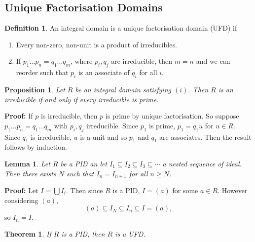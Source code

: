 \documentclass[12pt]{article}
\newtheorem{theorem}{Theorem}[section]
\newtheorem{lemma}{Lemma}[section]
\newtheorem{proposition}{Proposition}[section]
\theoremstyle{definition}
\newtheorem{definition}{Definition}[section]
\theoremstyle{remark}
\begin{document}
\subsection{Unique Factorisation Domains}%
\label{sub:unique_factorisation_domains}

\begin{definition}
	An integral domain is a unique factorisation domain (UFD) if
	\begin{enumerate}[label = (\roman*)]
		\item Every non-zero, non-unit is a product of irreducibles.
		\item If $p_1\ldots p_n = q_1 \ldots q_m$, where $p_i, q_j$ are irreducible, then $m = n$ and we can reorder such that $p_i$ is an associate of $q_i$ for all $i$.
	\end{enumerate}
\end{definition}

\begin{proposition}
	Let $R$ be an integral domain satisfying $(i)$. Then $R$ is an irreducible if and only if every irreducible is prime.
\end{proposition}

\begin{adjustbox}{minipage = \columnwidth - 25.5pt, margin=1em, frame=1pt, margin=0em}
\textbf{Proof:} If $p$ is irreducible, then $p$ is prime by unique factorisation. So suppose $p_1\ldots p_n = q_1 \ldots q_m$ with $p_i, q_j$ irreducible. Since $p_1$ is prime, $p_1 = q_1 u$ for $u \in R$. Since $q_1$ is irreducible, $u$ is a unit and so $p_1$ and $q_1$ are associates. Then the result follows by induction.
\end{adjustbox}

\begin{lemma}
	Let $R$ be a PID an let $I_1 \subseteq I_2 \subseteq I_3 \subseteq \cdots$ a nested sequence of ideal. Then there exists $N$ such that $I_n = I_{n + 1}$ for all $n \geq N$.
\end{lemma}

\begin{adjustbox}{minipage = \columnwidth - 25.5pt, margin=1em, frame=1pt, margin=0em}
	\textbf{Proof:} Let $I = \bigcup I_i$. Then since $R$ is a PID, $I = (a)$ for some $a \in R$. However considering $(a)$,
	\[
		(a) \subseteq I_N \subseteq I_n \subseteq I = (a)
	,\]
	so $I_n = I$.
\end{adjustbox}

\begin{theorem}
	If $R$ is a PID, then $R$ is a UFD.
\end{theorem}
\end{document}
